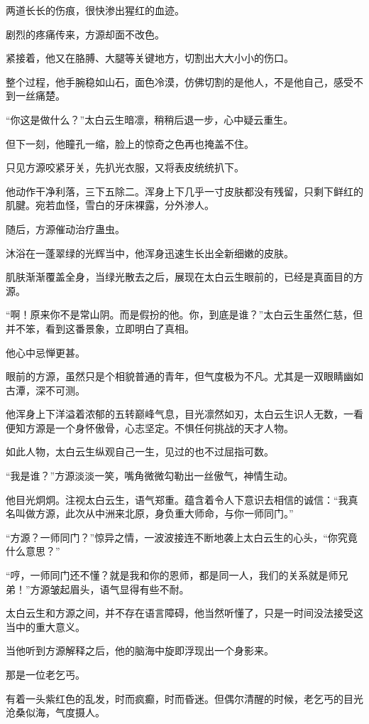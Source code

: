 \begin{this_body}
两道长长的伤痕，很快渗出猩红的血迹。

剧烈的疼痛传来，方源却面不改色。

紧接着，他又在胳膊、大腿等关键地方，切割出大大小小的伤口。

整个过程，他手腕稳如山石，面色冷漠，仿佛切割的是他人，不是他自己，感受不到一丝痛楚。

“你这是做什么？”太白云生暗凛，稍稍后退一步，心中疑云重生。

但下一刻，他瞳孔一缩，脸上的惊奇之色再也掩盖不住。

只见方源咬紧牙关，先扒光衣服，又将表皮统统扒下。

他动作干净利落，三下五除二。浑身上下几乎一寸皮肤都没有残留，只剩下鲜红的肌腱。宛若血怪，雪白的牙床裸露，分外渗人。

随后，方源催动治疗蛊虫。

沐浴在一蓬翠绿的光辉当中，他浑身迅速生长出全新细嫩的皮肤。

肌肤渐渐覆盖全身，当绿光散去之后，展现在太白云生眼前的，已经是真面目的方源。

“啊！原来你不是常山阴。而是假扮的他。你，到底是谁？”太白云生虽然仁慈，但并不笨，看到这番景象，立即明白了真相。

他心中忌惮更甚。

眼前的方源，虽然只是个相貌普通的青年，但气度极为不凡。尤其是一双眼睛幽如古潭，深不可测。

他浑身上下洋溢着浓郁的五转巅峰气息，目光凛然如刃，太白云生识人无数，一看便知方源是一个身怀傲骨，心志坚定。不惧任何挑战的天才人物。

如此人物，太白云生纵观自己一生，见过的也不过屈指可数。

“我是谁？”方源淡淡一笑，嘴角微微勾勒出一丝傲气，神情生动。

他目光炯炯。注视太白云生，语气郑重。蕴含着令人下意识去相信的诚信：“我真名叫做方源，此次从中洲来北原，身负重大师命，与你一师同门。”

“方源？一师同门？”惊异之情，一波波接连不断地袭上太白云生的心头，“你究竟什么意思？”

“哼，一师同门还不懂？就是我和你的恩师，都是同一人，我们的关系就是师兄弟！”方源皱起眉头，语气显得有些不耐。

太白云生和方源之间，并不存在语言障碍，他当然听懂了，只是一时间没法接受这当中的重大意义。

当他听到方源解释之后，他的脑海中旋即浮现出一个身影来。

那是一位老乞丐。

有着一头紫红色的乱发，时而疯癫，时而昏迷。但偶尔清醒的时候，老乞丐的目光沧桑似海，气度摄人。


\end{this_body}
